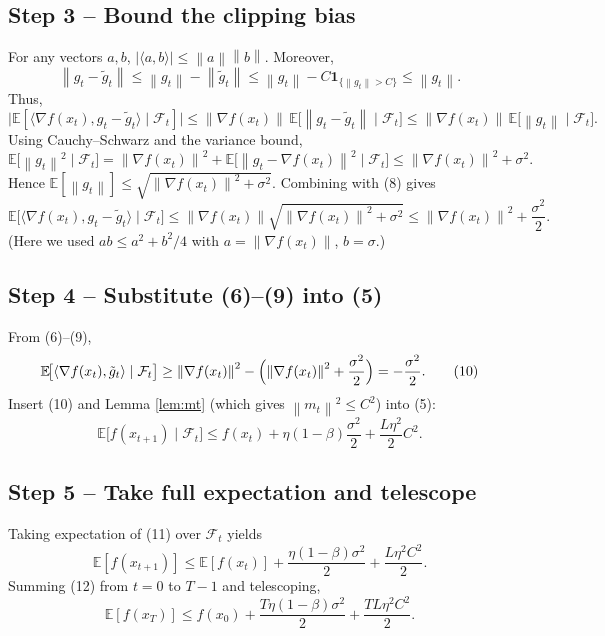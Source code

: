 \documentclass{article}
\newcommand{\EE}{\mathbb{E}}
\newcommand{\norm}[1]{\left\|#1\right\|}
\begin{document}
\subsection*{Step 3 – Bound the clipping bias}
For any vectors $a,b$, $|\langle a,b\rangle|\le \norm{a}\norm{b}$. Moreover,
\[
\norm{g_{t}-\tilde g_{t}}\le \norm{g_{t}}-\norm{\tilde g_{t}}
\le \norm{g_{t}}-C\mathbf{1}_{\{\norm{g_{t}}>C\}}
\le \norm{g_{t}}.
\]
Thus,
\[
\bigl|\EE[\langle\nabla f(x_{t}),g_{t}-\tilde g_{t}\rangle\mid\mathcal{F}_{t}]\bigr|
\le \norm{\nabla f(x_{t})}\,\EE\!\bigl[\norm{g_{t}-\tilde g_{t}}\mid\mathcal{F}_{t}\bigr]
\le \norm{\nabla f(x_{t})}\,\EE\!\bigl[\norm{g_{t}}\mid\mathcal{F}_{t}\bigr].
\tag{8}
\]
Using Cauchy–Schwarz and the variance bound,
\[
\EE\!\bigl[\norm{g_{t}}^{2}\mid\mathcal{F}_{t}\bigr]
= \norm{\nabla f(x_{t})}^{2}+\EE\!\bigl[\norm{g_{t}-\nabla f(x_{t})}^{2}\mid\mathcal{F}_{t}\bigr]
\le \norm{\nabla f(x_{t})}^{2}+\sigma^{2}.
\]
Hence $\EE[\norm{g_{t}}]\le \sqrt{\norm{\nabla f(x_{t})}^{2}+\sigma^{2}}$. Combining with (8) gives
\[
\EE\!\bigl[\langle\nabla f(x_{t}),g_{t}-\tilde g_{t}\rangle\mid\mathcal{F}_{t}\bigr]
\le \norm{\nabla f(x_{t})}\sqrt{\norm{\nabla f(x_{t})}^{2}+\sigma^{2}}
\le \norm{\nabla f(x_{t})}^{2}+\frac{\sigma^{2}}{2}.
\tag{9}
\]
(Here we used $ab\le a^{2}+b^{2}/4$ with $a=\norm{\nabla f(x_{t})}$, $b=\sigma$.)

\subsection*{Step 4 – Substitute (6)–(9) into (5)}
From (6)–(9),
\[
\EE\!\bigl[\langle\nabla f(x_{t}),\tilde g_{t}\rangle\mid\mathcal{F}_{t}\bigr]
\ge \norm{\nabla f(x_{t})}^{2}
-\Bigl(\norm{\nabla f(x_{t})}^{2}+\frac{\sigma^{2}}{2}\Bigr)
= -\frac{\sigma^{2}}{2}.
\tag{10}
\]
Insert (10) and Lemma \ref{lem:mt} (which gives $\norm{m_{t}}^{2}\le C^{2}$) into (5):
\[
\EE\!\bigl[f(x_{t+1})\mid\mathcal{F}_{t}\bigr]
\le f(x_{t})+\eta(1-\beta)\frac{\sigma^{2}}{2}
+\frac{L\eta^{2}}{2}C^{2}.
\tag{11}
\]

\subsection*{Step 5 – Take full expectation and telescope}
Taking expectation of (11) over $\mathcal{F}_{t}$ yields
\[
\EE[f(x_{t+1})]\le \EE[f(x_{t})]+\frac{\eta(1-\beta)\sigma^{2}}{2}
+\frac{L\eta^{2}C^{2}}{2}.
\tag{12}
\]
Summing (12) from $t=0$ to $T-1$ and telescoping,
\[
\EE[f(x_{T})]\le f(x_{0})+ \frac{T\eta(1-\beta)\sigma^{2}}{2}
+\frac{TL\eta^{2}C^{2}}{2}.
\tag{13}
\]
\end{document}
